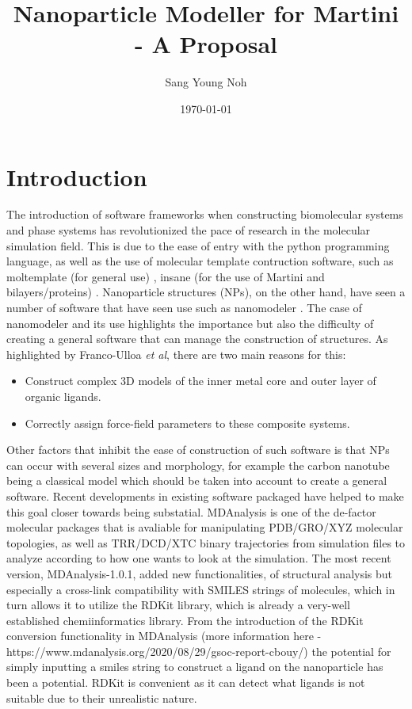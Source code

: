 \documentclass[12pt]{article}
\begin{document}
\title{Nanoparticle Modeller for Martini - A Proposal}
\author{Sang Young Noh}
\date{\today}
\maketitle
\section{Introduction}
The introduction of software frameworks when constructing biomolecular systems and phase systems has revolutionized the pace of research in the
molecular simulation field. This is due to the ease of entry with the python programming language, as well as the use of molecular template contruction software,
such as moltemplate (for general use) \cite{Moltemplate}, insane (for the use of Martini and bilayers/proteins) \cite{INSANE}. Nanoparticle structures (NPs), on the other hand, have seen a number of software that
have seen use such as nanomodeler \cite{Nanomodeller}. The case of nanomodeler and its use highlights the importance but also the difficulty of creating a general software that can manage the
construction of structures. As highlighted by Franco-Ulloa \emph{et al}, there are two main reasons for this:
\begin{itemize}
\item Construct complex 3D models of the inner metal core and outer layer of organic ligands.
\item Correctly assign force-field parameters to these composite systems.
\end{itemize} 
Other factors that inhibit the ease of construction of such software is that NPs can occur with several sizes and morphology, for example the carbon nanotube being a classical
model which should be taken into account to create a general software. 
\newline
\newline
Recent developments in existing software packaged have helped to make this goal closer towards being substatial. MDAnalysis is one of the de-factor molecular packages that
is avaliable for manipulating PDB/GRO/XYZ molecular topologies, as well as TRR/DCD/XTC binary trajectories from simulation files to analyze according to how one wants to look at the simulation. 
The most recent version, MDAnalysis-1.0.1, added new functionalities, of structural analysis but especially a cross-link compatibility with SMILES strings of molecules, which in turn
allows it to utilize the RDKit library, which is already a very-well established chemiinformatics library. From the introduction of the RDKit conversion functionality in MDAnalysis (more information here - https://www.mdanalysis.org/2020/08/29/gsoc-report-cbouy/) the potential for simply inputting a smiles string to construct a ligand on the nanoparticle has been a potential. RDKit is convenient as it can detect what ligands is not suitable due to their unrealistic nature.
\end{document}

